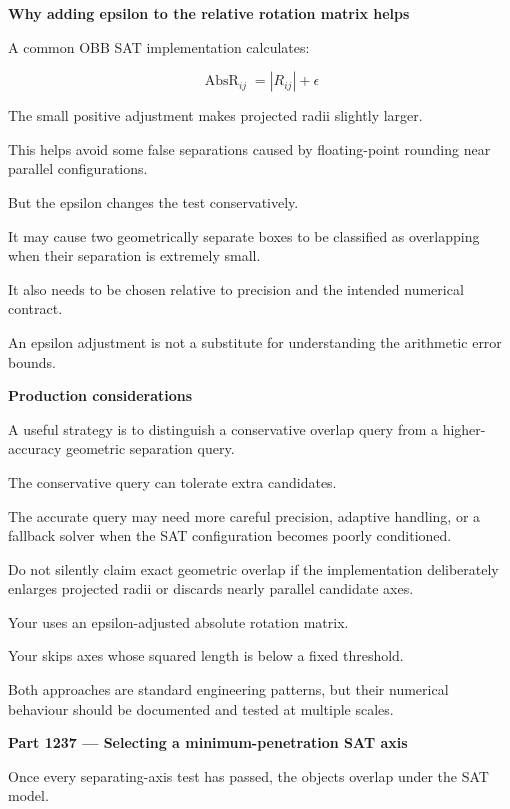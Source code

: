 \textbf{Why adding epsilon to the relative rotation matrix helps}

A common OBB SAT implementation calculates:

\[
\boxed{ \operatorname{AbsR}_{ij}=|R_{ij}|+\epsilon }
\]

The small positive adjustment makes projected radii slightly larger.

This helps avoid some false separations caused by floating-point rounding near parallel configurations.

But the epsilon changes the test conservatively.

It may cause two geometrically separate boxes to be classified as overlapping when their separation is extremely small.

It also needs to be chosen relative to precision and the intended numerical contract.

An epsilon adjustment is not a substitute for understanding the arithmetic error bounds.

\textbf{Production considerations}

A useful strategy is to distinguish a conservative overlap query from a higher-accuracy geometric separation query.

The conservative query can tolerate extra candidates.

The accurate query may need more careful precision, adaptive handling, or a fallback solver when the SAT configuration becomes poorly conditioned.

Do not silently claim exact geometric overlap if the implementation deliberately enlarges projected radii or discards nearly parallel candidate axes.

Your  uses an epsilon-adjusted absolute rotation matrix.

Your  skips axes whose squared length is below a fixed threshold.

Both approaches are standard engineering patterns, but their numerical behaviour should be documented and tested at multiple scales.

\textbf{Part 1237 --- Selecting a minimum-penetration SAT axis}

Once every separating-axis test has passed, the objects overlap under the SAT model.

